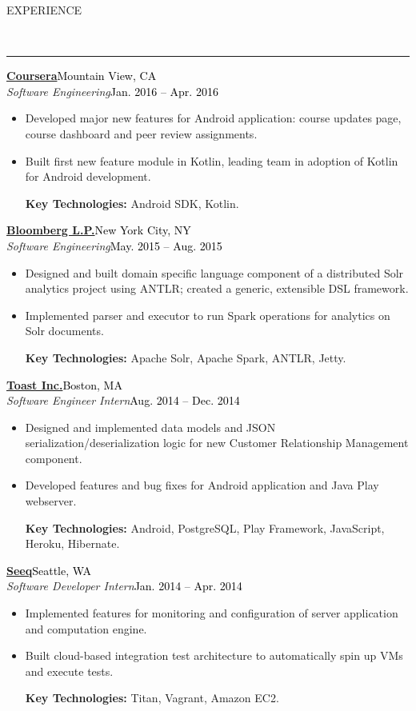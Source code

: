 \documentclass[11pt, letterpaper, oneside]{article}
\newcommand{\HRule}[2]{\textcolor{#1}{\rule{\linewidth}{#2}}}
\newcommand{\sectiontitle}[1]{\begin{minipage}{\textwidth}\vspace{-7.5pt}\begin{flushleft}\hspace{-20.5pt}\vspace{-25pt}
\Large\MakeUppercase{#1}\end{flushleft}\end{minipage}\\\HRule{black}{0.15mm}\vspace{\baselineskip}}
\newenvironment{ressection}[1]{
  \sectiontitle{#1}}
  {\vspace{-\baselineskip}}
\newcommand{\resentryheader}[4]{
    \vspace{-6pt}
    \textbf{#1}\hspace{\stretch{1}}\textcolor{black}{#3}\\
    \textit{#2}\hspace{\stretch{1}}\textcolor{black}{#4}\\
}
\newcommand{\resitem}[1]{
    \vspace{2pt}
    \item \begin{flushleft} #1 \end{flushleft}
}
\newenvironment{resentry}[4]{
  \begin{minipage}{\textwidth}
  \vspace{-3pt}
    \resentryheader{#1}{#2}{#3}{#4}
        \vspace{-\baselineskip}
    \begin{itemize}[noitemsep,nolistsep]
}{
    \end{itemize}
        \vspace{\baselineskip}
        \end{minipage}
}
\begin{document}
\begin{ressection}{Experience}
 \begin{resentry}{\href{https://www.coursera.org/}{Coursera}}{Software Engineering}{Mountain View, CA}{Jan. 2016 -- Apr. 2016}
    \resitem{Developed major new features for Android application: course updates page, course dashboard and peer review assignments.}
    \resitem{Built first new feature module in Kotlin, leading team in adoption of Kotlin for Android development.}
    \vspace{3pt} \hspace{-15pt}
    \textbf{Key Technologies:} Android SDK, Kotlin.
    \vspace{6pt} 
  \end{resentry}  
  \begin{resentry}{\href{http://www.bloomberg.com/professional/}{Bloomberg L.P.}}{Software Engineering}{New York City, NY}{May. 2015 -- Aug. 2015}
    \resitem{Designed and built domain specific language component of a distributed Solr analytics project using ANTLR; created a generic, extensible DSL framework.}
    \resitem{Implemented parser and executor to run Spark operations for analytics on Solr documents.}
    \vspace{3pt} \hspace{-15pt}
    \textbf{Key Technologies:} Apache Solr, Apache Spark, ANTLR, Jetty.
    \vspace{6pt} 
  \end{resentry}  
  \begin{resentry}{\href{http://pos.toasttab.com/}{Toast Inc.}}{Software Engineer Intern}{Boston, MA}{Aug. 2014 -- Dec. 2014}
   \resitem{Designed and implemented data models and JSON serialization/deserialization logic for new Customer Relationship Management component. }
    \resitem{Developed features and bug fixes for Android application and Java Play webserver.}
    \vspace{3pt}  \hspace{-15pt}
    \textbf{Key Technologies:} Android, PostgreSQL, Play Framework, JavaScript, Heroku, Hibernate.
	\vspace{6pt}   
  \end{resentry}  
  \begin{resentry}{\href{http://www.seeq.com/}{Seeq}}{Software Developer Intern}{Seattle, WA}{Jan. 2014 -- Apr. 2014}
    \resitem{Implemented features for monitoring and configuration of server application and computation engine.}    
    \resitem{Built cloud-based integration test architecture to automatically spin up VMs and execute tests.}
    \vspace{3pt} \hspace{-15pt}
    \textbf{Key Technologies:} Titan, Vagrant, Amazon EC2.
	\vspace{6pt}   
  \end{resentry}
\end{ressection}
\end{document}
